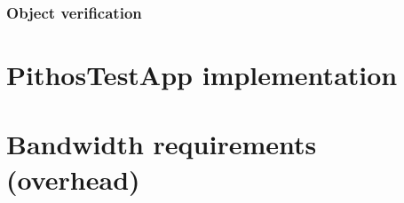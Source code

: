     \subsubsection{Object verification}
    \label{object_verification_implementation}

\section{PithosTestApp implementation}
\label{pithostestapp}

\section{Bandwidth requirements (overhead)}
